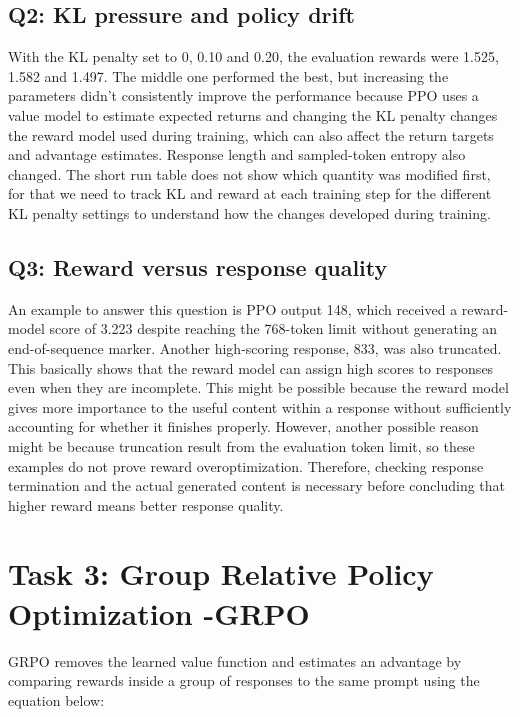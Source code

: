 \documentclass{article}
\begin{document}
\subsection{Q2: KL pressure and policy drift}



With the KL penalty set to 0, 0.10 and 0.20, the evaluation rewards were 1.525, 1.582 and 1.497. The middle one performed the best, but increasing the parameters didn't consistently improve the performance because PPO uses a value model to estimate expected returns and changing the KL penalty changes the reward model used during training, which can also affect the return targets and advantage estimates.
Response length and sampled-token entropy also changed. The short run table does not show which quantity was modified first, for that we need to track KL and reward at each training step for the different KL penalty settings to understand how the changes developed during training.

\subsection{Q3: Reward versus response quality}

An example to answer this question is PPO output 148, which received a reward-model score of 3.223 despite reaching the 768-token limit without generating an end-of-sequence marker. Another high-scoring response, 833, was also truncated. This basically shows that the reward model can assign high scores to responses even when they are incomplete. This might be possible because the reward model gives more importance to the useful content  within a response without sufficiently accounting for whether it finishes properly. However, another possible reason might be because truncation result from the evaluation token limit, so these examples do not prove reward overoptimization. Therefore, checking response termination and the actual generated content is necessary before concluding that higher reward means better response quality.

\FloatBarrier

\section{Task 3: Group Relative Policy Optimization -GRPO}

GRPO removes the learned value function and estimates an advantage by comparing rewards inside a group of responses to the same prompt using the equation below:
\end{document}
